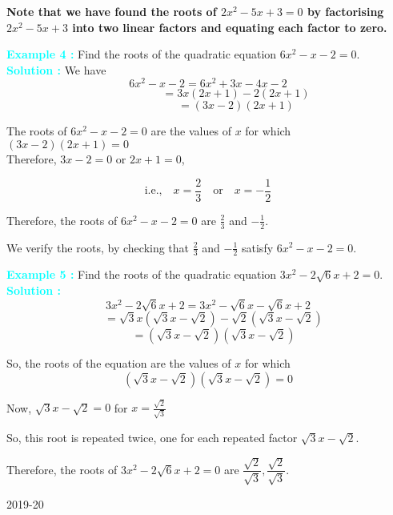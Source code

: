 \documentclass[12pt]{article}
\begin{document}
 \textbf{Note that we have found the roots of $2x^2 - 5x + 3 = 0$ by factorising $2x^2 - 5x + 3$ into two linear factors and equating each factor to zero.}

\vspace{1em}

\noindent \textcolor{cyan}{\textbf{Example 4 :}} Find the roots of the quadratic equation $6x^2 - x - 2 = 0$.\\
\textcolor{cyan}{\textbf{Solution :}} We have
\[
6x^2 - x - 2 = 6x^2 + 3x - 4x - 2
\]
\[
\quad\quad\quad\quad\quad = 3x(2x + 1) - 2(2x + 1)
\]
\[
\quad\quad\quad\quad\quad = (3x - 2)(2x + 1)
\]

The roots of $6x^2 - x - 2 = 0$ are the values of $x$ for which $(3x - 2)(2x + 1) = 0$ \\
Therefore, $3x - 2 = 0$ or $2x + 1 = 0$,

\[
\text{i.e.,} \quad x = \frac{2}{3} \quad \text{or} \quad x = -\frac{1}{2}
\]

Therefore, the roots of $6x^2 - x - 2 = 0$ are $\frac{2}{3}$ and $-\frac{1}{2}$.

\vspace{1em}

We verify the roots, by checking that $\frac{2}{3}$ and $-\frac{1}{2}$ satisfy $6x^2 - x - 2 = 0$.

\vspace{1em}

\noindent \textcolor{cyan}{\textbf{Example 5 :}} Find the roots of the quadratic equation $3x^2 - 2\sqrt{6}x + 2 = 0$.\\
\textcolor{cyan}{\textbf{Solution :}} 
\[
3x^2 - 2\sqrt{6}x + 2 = 3x^2 - \sqrt{6}x - \sqrt{6}x + 2
\]
\[
\quad = \sqrt{3}x(\sqrt{3}x - \sqrt{2}) - \sqrt{2}(\sqrt{3}x - \sqrt{2})
\]
\[
\quad = (\sqrt{3}x - \sqrt{2})(\sqrt{3}x - \sqrt{2})
\]

So, the roots of the equation are the values of $x$ for which
\[
(\sqrt{3}x - \sqrt{2})(\sqrt{3}x - \sqrt{2}) = 0
\]

Now, $\sqrt{3}x - \sqrt{2} = 0$ for $x = \frac{\sqrt{2}}{\sqrt{3}}$

So, this root is repeated twice, one for each repeated factor $\sqrt{3}x - \sqrt{2}$.

\vspace{1em}

Therefore, the roots of $3x^2 - 2\sqrt{6}x + 2 = 0$ are $\dfrac{\sqrt{2}}{\sqrt{3}}, \dfrac{\sqrt{2}}{\sqrt{3}}$.
\vspace{2cm}
\begin{center}
2019-20
\end{center}
\end{document}
